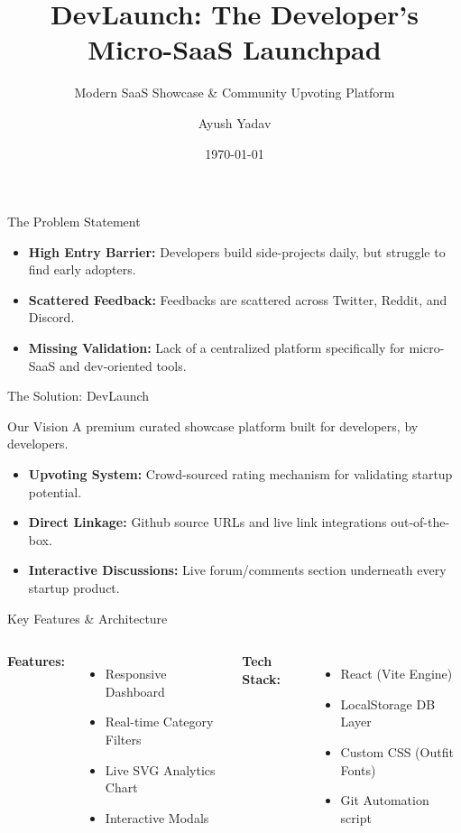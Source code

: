 \documentclass{beamer}
\title[DevLaunch Startup]{DevLaunch: The Developer's Micro-SaaS Launchpad}
\subtitle{Modern SaaS Showcase \& Community Upvoting Platform}
\author{Ayush Yadav}
\institute{Developer Startup Initiative}
\date{\today}
\begin{document}
\begin{frame}
    \titlepage
\end{frame}

\begin{frame}{The Problem Statement}
    \begin{itemize}
        \item \textbf{High Entry Barrier:} Developers build side-projects daily, but struggle to find early adopters.
        \item \textbf{Scattered Feedback:} Feedbacks are scattered across Twitter, Reddit, and Discord.
        \item \textbf{Missing Validation:} Lack of a centralized platform specifically for micro-SaaS and dev-oriented tools.
    \end{itemize}
\end{frame}

\begin{frame}{The Solution: DevLaunch}
    \begin{block}{Our Vision}
        A premium curated showcase platform built for developers, by developers.
    \end{block}
    \begin{itemize}
        \item \textbf{Upvoting System:} Crowd-sourced rating mechanism for validating startup potential.
        \item \textbf{Direct Linkage:} Github source URLs and live link integrations out-of-the-box.
        \item \textbf{Interactive Discussions:} Live forum/comments section underneath every startup product.
    \end{itemize}
\end{frame}

\begin{frame}{Key Features \& Architecture}
    \begin{columns}
        \textbf{Features:}
        \begin{itemize}
            \item Responsive Dashboard
            \item Real-time Category Filters
            \item Live SVG Analytics Chart
            \item Interactive Modals
        \end{itemize}
        
        \textbf{Tech Stack:}
        \begin{itemize}
            \item React (Vite Engine)
            \item LocalStorage DB Layer
            \item Custom CSS (Outfit Fonts)
            \item Git Automation script
        \end{itemize}
    \end{columns}
\end{frame}
\end{document}
